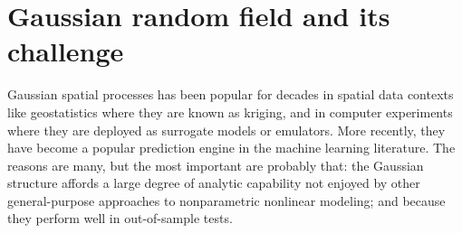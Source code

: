 \documentclass[
12pt, %
a4paper, %
oneside, %
headinclude,footinclude, %
BCOR5mm, %
]{scrartcl}
\title{\normalfont\spacedallcaps{Understanding of spatial problem for Large Datasets}} %
\author{\spacedlowsmallcaps{Yewen Chen}} %
\date{} %
\begin{document}
\renewcommand{\UrlFont}{\small\tt}

\setlength{\abovecaptionskip}{0pt}
\setlength{\belowcaptionskip}{10pt}
\renewcommand{\algorithmicrequire}{\textbf{Input:}}  %
\renewcommand{\algorithmicensure}{\textbf{Update step:}} %
\renewcommand{\sectionmark}[1]{\markright{\spacedlowsmallcaps{#1}}} %
\lehead{\mbox{\llap{\small\thepage\kern1em\color{halfgray} \vline}\color{halfgray}\hspace{0.5em}\rightmark\hfil}} %

\pagestyle{scrheadings} %


\maketitle %

\setcounter{tocdepth}{4} %

\tableofcontents %

\listoffigures %

\listoftables %

\newpage
\section{Gaussian random field and its challenge}
Gaussian spatial processes has been popular for decades in spatial data contexts like geostatistics where they are known as kriging, and in computer experiments where they are deployed as surrogate models or emulators. More recently, they have become a popular prediction engine in the machine learning literature. The reasons are many, but the most important are probably that: the Gaussian structure affords a large degree of analytic capability not enjoyed by other general-purpose approaches to nonparametric nonlinear modeling; and because they perform well in out-of-sample tests.
\end{document}
